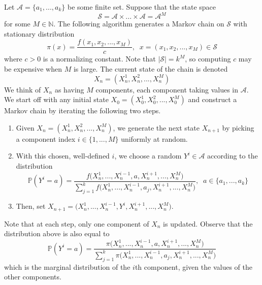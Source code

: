     Let $\mathcal{A} = \{a_1, ..., a_k\}$ be some finite set. Suppose that the state space 
    \begin{equation}
      \mathcal{S} = \mathcal{A} \times ... \times \mathcal{A} = \mathcal{A}^M
    \end{equation}
    for some $M \in \mathbb{N}$. The following algorithm generates a Markov chain on $\mathcal{S}$ with stationary distribution
    \begin{equation}
      \pi(x) = \frac{f(x_1, x_2, ..., x_M)}{c}, \;\; x = (x_1, x_2, ..., x_M) \in \mathcal{S} 
    \end{equation}
    where $c >0$ is a normalizing constant. Note that $|\mathcal{S}| = k^M$, so computing $c$ may be expensive when $M$ is large. The current state of the chain is denoted 
    \begin{equation}
      X_n = (X_n^1, X_n^2, ..., X_n^M)
    \end{equation}
    We think of $X_n$ as having $M$ components, each component taking values in $\mathcal{A}$. We start off with any initial state $X_0 = (X_0^1, X_0^2, ..., X_0^M)$ and construct a Markov chain by iterating the following two steps. 
    \begin{enumerate}
      \item Given $X_n = (X_n^1, X_n^2, ..., X_n^M)$, we generate the next state $X_{n+1}$ by picking a component index $i \in \{1, ..., M\}$ uniformly at random. 
      \item With this chosen, well-defined $i$, we choose a random $Y^i \in \mathcal{A}$ according to the distribution
      \begin{equation}
        \mathbb{P}(Y^i = a) = \frac{f\big(X_n^1 ,..., X_n^{i-1}, a, X_n^{i+1}, ..., X_n^M\big)}{\sum_{j=1}^k f\big(X_n^1 ,..., X_n^{i-1}, a_j, X_n^{i+1}, ..., X_n^M\big)}, \;\; a \in \{a_1, ..., a_k\}
      \end{equation}
      \item Then, set $X_{n+1} = \big(X_n^1, ..., X_n^{i-1}, Y^i, X_n^{i+1}, ..., X_n^M\big)$. 
    \end{enumerate}
    Note that at each step, only one component of $X_n$ is updated. Observe that the distribution above is also equal to 
    \begin{equation}
      \mathbb{P}(Y^i = a) = \frac{\pi\big(X_n^1 ,..., X_n^{i-1}, a, X_n^{i+1}, ..., X_n^M\big)}{\sum_{j=1}^k \pi \big(X_n^1 ,..., X_n^{i-1}, a_j, X_n^{i+1}, ..., X_n^M\big)}
    \end{equation}
    which is the marginal distribution of the $i$th component, given the values of the other components. 

